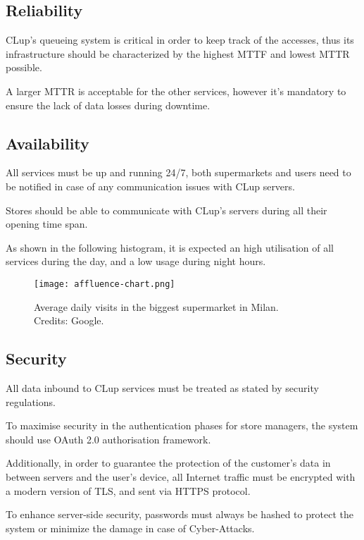 \documentclass[../../main.tex]{subfiles}
\begin{document}
	\subsection{Reliability}

	CLup's queueing system is critical in order to keep track of the accesses, thus its infrastructure 
	should be characterized by the highest MTTF and lowest MTTR possible.

	A larger MTTR is acceptable for the other services, however it's mandatory to ensure the lack of 
	data losses during downtime.

	\subsection{Availability}

	All services must be up and running 24/7, both supermarkets and users need to be notified in case of 
	any communication issues with CLup servers.

	Stores should be able to communicate with CLup's servers during all their opening time span.

	As shown in the following histogram, it is expected an high utilisation of all services during the day, 
	and a low usage during night hours.

	\begin{figure}[h!]
	    \centering
	    \texttt{[image: affluence-chart.png]}
	    \caption{Average daily visits in the biggest supermarket in Milan. \\Credits: Google.}
  	\end{figure}

	\subsection{Security}

	All data inbound to CLup services must be treated as stated by security regulations. 

	To maximise security in the authentication phases for store managers, the system should use 
	OAuth 2.0 authorisation framework.

	Additionally, in order to guarantee the protection of the customer's data in between servers and the 
	user's device, all Internet traffic must be encrypted with a modern version of TLS, and sent via HTTPS protocol.

	To enhance server-side security, passwords must always be hashed to protect the system or minimize the damage 
	in case of Cyber-Attacks. 
\end{document}
